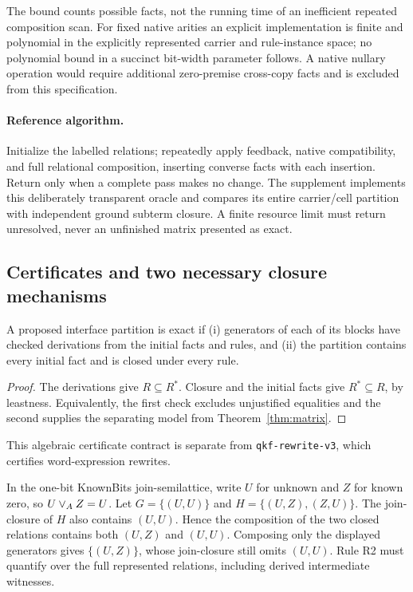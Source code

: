 The bound counts possible facts, not the running time of an inefficient repeated composition scan. For fixed native arities an explicit implementation is finite and polynomial in the explicitly represented carrier and rule-instance space; no polynomial bound in a succinct bit-width parameter follows. A native nullary operation would require additional zero-premise cross-copy facts and is excluded from this specification.

\paragraph{Reference algorithm.}
Initialize the labelled relations; repeatedly apply feedback, native compatibility, and full relational composition, inserting converse facts with each insertion. Return only when a complete pass makes no change. The supplement implements this deliberately transparent oracle and compares its entire carrier/cell partition with independent ground subterm closure. A finite resource limit must return unresolved, never an unfinished matrix presented as exact.

\subsection{Certificates and two necessary closure mechanisms}
\begin{corollary}\label{cor:matrixcertificate}
A proposed interface partition is exact if (i) generators of each of its blocks have checked derivations from the initial facts and rules, and (ii) the partition contains every initial fact and is closed under every rule.
\end{corollary}
\begin{proof}
The derivations give $R\subseteq R^*$. Closure and the initial facts give $R^*\subseteq R$, by leastness. Equivalently, the first check excludes unjustified equalities and the second supplies the separating model from Theorem~\ref{thm:matrix}.
\end{proof}
This algebraic certificate contract is separate from \texttt{qkf-rewrite-v3}, which certifies word-expression rewrites.

\begin{example}\label{ex:generators}
In the one-bit KnownBits join-semilattice, write $U$ for unknown and $Z$ for known zero, so $U\vee_A Z=U$. Let
$G=\{(U,U)\}$ and $H=\{(U,Z),(Z,U)\}$.
The join-closure of $H$ also contains $(U,U)$. Hence the composition of the two closed relations contains both $(U,Z)$ and $(U,U)$. Composing only the displayed generators gives $\{(U,Z)\}$, whose join-closure still omits $(U,U)$. Rule R2 must quantify over the full represented relations, including derived intermediate witnesses.
\end{example}


